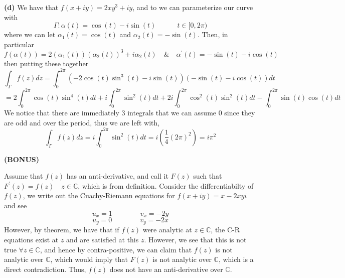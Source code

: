 \documentclass[10pt]{article}
\newcommand{\C}{\mathbb{C}}
\begin{document}
\textbf{(d)}
We have that $f(x+iy) = 2xy^{3} + iy$, and to we can parameterize our curve with
$$\Gamma : \alpha(t) = \cos(t) - i\sin(t) \hspace{3em} t\in [0,2\pi)$$
where we can let $\alpha_{1}(t) = \cos(t)$ and $\alpha_{2}(t) = -\sin(t)$. Then, in particular
$$f(\alpha(t)) = 2(\alpha_{1}(t))(\alpha_{2}(t))^{3} + i\alpha_{2}(t) \hspace{1em} \& \hspace{1em} \alpha^{\prime}(t) = -\sin(t) - i\cos(t)$$
then putting these together
$$\int_{\Gamma}f(z)dz = \int_{0}^{2\pi}(-2\cos(t)\sin^{3}(t) - i\sin(t))(-\sin(t) - i\cos(t))dt$$
$$ = 2\int_{0}^{2\pi}\cos(t)\sin^{4}(t)dt + i\int_{0}^{2\pi}\sin^{2}(t)dt + 2i\int_{0}^{2\pi}\cos^{2}(t)\sin^{2}(t)dt - \int_{0}^{2\pi}\sin(t)\cos(t)dt$$
We notice that there are immediately 3 integrals that we can assume 0 since they are odd and over the period, thus we are left with,
$$\int_{\Gamma}f(z)dz = i\int_{0}^{2\pi}\sin^{2}(t)dt = i\left(\frac{1}{4}(2\pi)^{2}\right) = i\pi^{2}$$

\textbf{(BONUS)}

Assume that $f(z)$ has an anti-derivative, and call it $F(z)$ such that $F^{\prime}(z) = f(z) \hspace{1em} z \in \C$, which is from definition. Consider the differentiabilty of $f(z)$, we write out the Cuachy-Riemann equations for $f(x + iy) = x-2xyi$ and see
$$u_{x} = 1 \hspace{4em} v_{x} = -2y$$
$$u_{y} = 0 \hspace{4em} v_{y} = -2x$$
However, by theorem, we have that if $f(z)$ were analytic at $z \in\C$, the C-R equations exist at $z$ and are satisfied at this $z$. However, we see that this is not true $\forall z \in \C$, and hence by contra-positive, we can claim that $f(z)$ is not analytic over $\C$, which would imply that $F(z)$ is not analytic over $\C$, which is a direct contradiction. Thus, $f(z)$ does not have an anti-derivative over $\C$.
\end{document}
